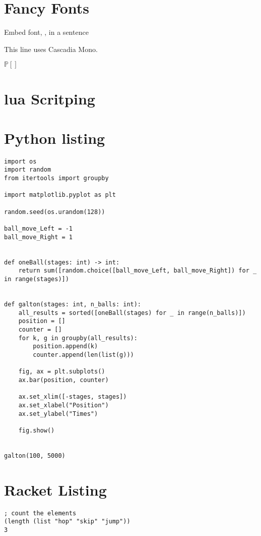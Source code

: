 \documentclass[12pt,a4paper]{article}
\begin{document}
\section{Fancy Fonts}

Embed font, , in a sentence

This line uses { Cascadia Mono.}

$\mathbb{P}[]$

\section{lua Scritping}



\section{Python listing}

\begin{lstlisting}
import os
import random
from itertools import groupby

import matplotlib.pyplot as plt

random.seed(os.urandom(128))

ball_move_Left = -1
ball_move_Right = 1


def oneBall(stages: int) -> int:
    return sum([random.choice([ball_move_Left, ball_move_Right]) for _ in range(stages)])


def galton(stages: int, n_balls: int):
    all_results = sorted([oneBall(stages) for _ in range(n_balls)])
    position = []
    counter = []
    for k, g in groupby(all_results):
        position.append(k)
        counter.append(len(list(g)))

    fig, ax = plt.subplots()
    ax.bar(position, counter)

    ax.set_xlim([-stages, stages])
    ax.set_xlabel("Position")
    ax.set_ylabel("Times")

    fig.show()


galton(100, 5000)
\end{lstlisting}

\section{Racket Listing}
\begin{lstlisting}[language=racket,style=rackeStyle]
; count the elements        
(length (list "hop" "skip" "jump"))
3
\end{lstlisting}
\end{document}
